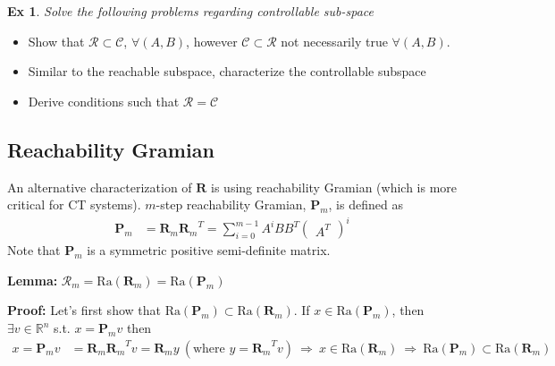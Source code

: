 \documentclass[twoside]{article}
\newtheorem{exmp}[theorem]{Ex}
\begin{document}
\begin{exmp}
Solve the following problems regarding controllable sub-space
\end{exmp}
\begin{itemize}
    \item Show that $\mathcal{R} \subset \mathcal{C}$, $\forall (A,B)$, however $\mathcal{C} \subset \mathcal{R}$ not necessarily true $\forall (A,B)$.
    \item Similar to the reachable subspace, characterize the controllable subspace
    \item Derive conditions such that $\mathcal{R} = \mathcal{C}$
\end{itemize}

\subsection{Reachability Gramian}

An alternative characterization of $\mathbf{R}$ is using reachability Gramian (which is more critical for CT systems).
$m$-step reachability Gramian, $\mathbf{P}_m$, is defined as
%
\begin{align}
 \mathbf{P}_m &= \mathbf{R}_m {\mathbf{R}_m}^T =\sum\limits_{i=0}^{m-1} A^i B B^T \begin{pmatrix} A^T \end{pmatrix}^i
\end{align}
%
Note that $\mathbf{P}_m$ is a symmetric positive semi-definite matrix.

\textbf{Lemma:} $\mathcal{R}_m = \mathrm{Ra}( \mathbf{R}_m ) = \mathrm{Ra} ( \mathbf{P}_m )$

\textbf{Proof:} Let's first show that $\mathrm{Ra}( \mathbf{P}_m ) \subset \mathrm{Ra}( \mathbf{R}_m )$. 
If $x \in \mathrm{Ra} (\mathbf{P}_m)$, then $\exists v \in \mathbb{R}^n$ s.t. $x = \mathbf{P}_m v$ then
%
\begin{align*}
 x = \mathbf{P}_m v &= \mathbf{R}_m {\mathbf{R}_m}^T v = \mathbf{R}_m y \ ( \text{where } y = {\mathbf{R}_m}^T v ) \ \Rightarrow \ x \in \mathrm{Ra}( \mathbf{R}_m ) \ \Rightarrow \ \mathrm{Ra}( \mathbf{P}_m ) \subset \mathrm{Ra}( \mathbf{R}_m )
\end{align*}
\end{document}
